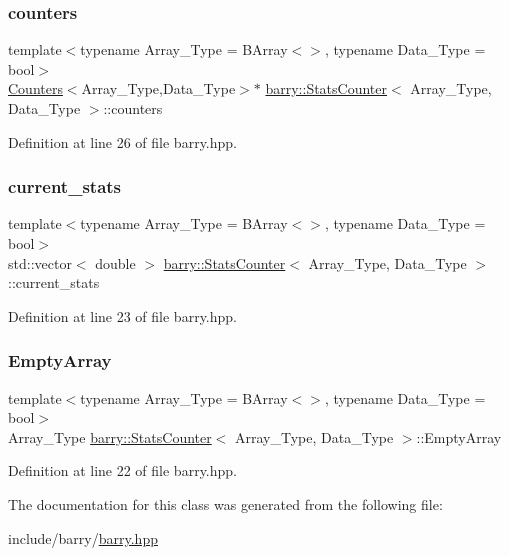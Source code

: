 \subsubsection{\texorpdfstring{counters}{counters}}
{\footnotesize\ttfamily template$<$typename Array\+\_\+\+Type = B\+Array$<$$>$, typename Data\+\_\+\+Type = bool$>$ \\
\hyperlink{classbarry_1_1_counters}{Counters}$<$Array\+\_\+\+Type,Data\+\_\+\+Type$>$$\ast$ \hyperlink{classbarry_1_1_stats_counter}{barry\+::\+Stats\+Counter}$<$ Array\+\_\+\+Type, Data\+\_\+\+Type $>$\+::counters}



Definition at line 26 of file barry.\+hpp.

\mbox{\label{classbarry_1_1_stats_counter_ad99718884cffbeca3cb98d574f6956a1}} 
\subsubsection{\texorpdfstring{current\+\_\+stats}{current\_stats}}
{\footnotesize\ttfamily template$<$typename Array\+\_\+\+Type = B\+Array$<$$>$, typename Data\+\_\+\+Type = bool$>$ \\
std\+::vector$<$ double $>$ \hyperlink{classbarry_1_1_stats_counter}{barry\+::\+Stats\+Counter}$<$ Array\+\_\+\+Type, Data\+\_\+\+Type $>$\+::current\+\_\+stats}



Definition at line 23 of file barry.\+hpp.

\mbox{\label{classbarry_1_1_stats_counter_ad78463fadfa385a69121c40fdc8fd193}} 
\subsubsection{\texorpdfstring{Empty\+Array}{EmptyArray}}
{\footnotesize\ttfamily template$<$typename Array\+\_\+\+Type = B\+Array$<$$>$, typename Data\+\_\+\+Type = bool$>$ \\
Array\+\_\+\+Type \hyperlink{classbarry_1_1_stats_counter}{barry\+::\+Stats\+Counter}$<$ Array\+\_\+\+Type, Data\+\_\+\+Type $>$\+::Empty\+Array}



Definition at line 22 of file barry.\+hpp.



The documentation for this class was generated from the following file\+:\begin{DoxyCompactItemize}
\item 
include/barry/\hyperlink{barry_8hpp}{barry.\+hpp}\end{DoxyCompactItemize}
